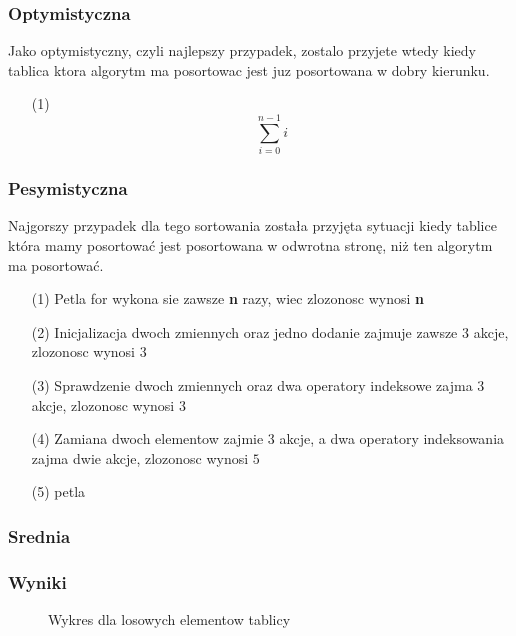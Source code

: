 \subsubsection*{Optymistyczna}
Jako optymistyczny, czyli najlepszy przypadek, zostalo przyjete wtedy kiedy tablica ktora algorytm ma posortowac jest juz posortowana w dobry kierunku.
\begin{itemize}
\item[(1)]{
\begin{equation}
\sum_{i=0}^{n-1} i
\end{equation}
}
\end{itemize}
\subsubsection*{Pesymistyczna}
Najgorszy przypadek dla tego sortowania została przyjęta sytuacji kiedy tablice która mamy posortować jest posortowana w odwrotna stronę, niż ten algorytm ma posortować.
\begin{itemize}
\item[(1)] Petla for wykona sie zawsze \textbf{n} razy, wiec zlozonosc wynosi \textbf{n}
\item[(2)] Inicjalizacja dwoch zmiennych oraz jedno dodanie zajmuje zawsze 3 akcje, zlozonosc wynosi $3$
\item[(3)] Sprawdzenie dwoch zmiennych oraz dwa operatory indeksowe zajma 3 akcje, zlozonosc wynosi  $3$
\item[(4)] Zamiana dwoch elementow zajmie 3 akcje, a dwa operatory indeksowania zajma dwie akcje, zlozonosc wynosi $5$
\item[(5)] petla
\end{itemize}


\subsubsection*{Srednia}

\subsubsection*{Wyniki}
\begin{figure}[h!]
  \begin{center}
    \caption{Wykres dla losowych elementow tablicy}
  \end{center}
\end{figure}
\FloatBarrier

